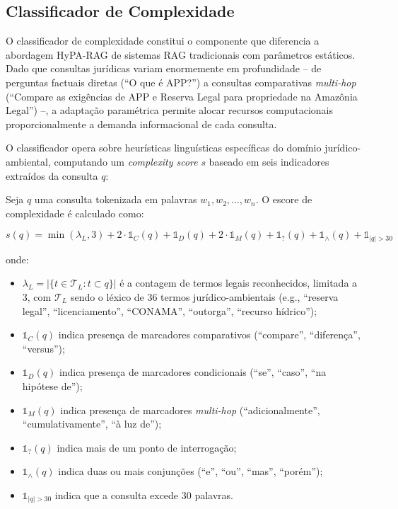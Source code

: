 \documentclass[12pt]{article}
\begin{document}
\subsection{Classificador de Complexidade}

O classificador de complexidade constitui o componente que diferencia a abordagem HyPA-RAG de sistemas RAG tradicionais com parâmetros estáticos. Dado que consultas jurídicas variam enormemente em profundidade -- de perguntas factuais diretas (``O que é APP?'') a consultas comparativas \textit{multi-hop} (``Compare as exigências de APP e Reserva Legal para propriedade na Amazônia Legal'') --, a adaptação paramétrica permite alocar recursos computacionais proporcionalmente a demanda informacional de cada consulta.

O classificador opera sobre heurísticas linguísticas específicas do domínio jurídico-ambiental, computando um \textit{complexity score} $s$ baseado em seis indicadores extraídos da consulta $q$:

Seja $q$ uma consulta tokenizada em palavras $w_1, w_2, \ldots, w_n$. O escore de complexidade é calculado como:

\begin{equation}
s(q) = \min(\lambda_L, 3) + 2 \cdot \mathbb{1}_{C}(q) + \mathbb{1}_{D}(q) + 2 \cdot \mathbb{1}_{M}(q) + \mathbb{1}_{?}(q) + \mathbb{1}_{\wedge}(q) + \mathbb{1}_{|q|>30}
\label{eq:complexity}
\end{equation}

\noindent onde:
\begin{itemize}
\item $\lambda_L = |\{t \in \mathcal{T}_L : t \subset q\}|$ é a contagem de termos legais reconhecidos, limitada a 3, com $\mathcal{T}_L$ sendo o léxico de 36 termos jurídico-ambientais (e.g., ``reserva legal'', ``licenciamento'', ``CONAMA'', ``outorga'', ``recurso hídrico'');
\item $\mathbb{1}_{C}(q)$ indica presença de marcadores comparativos (``compare'', ``diferença'', ``versus'');
\item $\mathbb{1}_{D}(q)$ indica presença de marcadores condicionais (``se'', ``caso'', ``na hipótese de'');
\item $\mathbb{1}_{M}(q)$ indica presença de marcadores \textit{multi-hop} (``adicionalmente'', ``cumulativamente'', ``à luz de'');
\item $\mathbb{1}_{?}(q)$ indica mais de um ponto de interrogação;
\item $\mathbb{1}_{\wedge}(q)$ indica duas ou mais conjunções (``e'', ``ou'', ``mas'', ``porém'');
\item $\mathbb{1}_{|q|>30}$ indica que a consulta excede 30 palavras.
\end{itemize}
\end{document}
